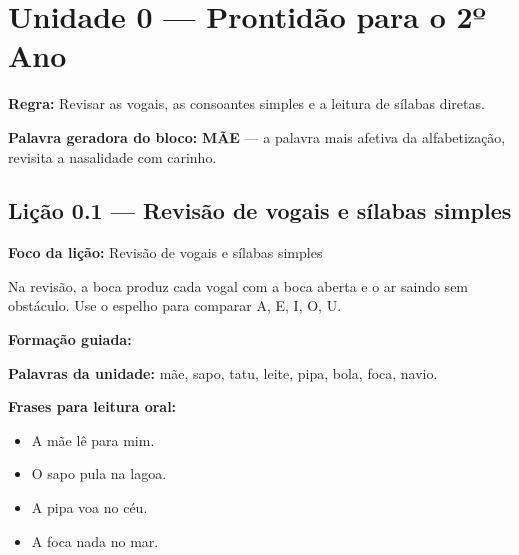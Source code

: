 

\chapter{Unidade 0 --- Prontidão para o 2º Ano}


\textbf{Regra:} Revisar as vogais, as consoantes simples e a leitura de sílabas diretas.

\textbf{Palavra geradora do bloco:} \textbf{MÃE} --- a palavra mais afetiva da alfabetização, revisita a nasalidade com carinho.

\section{Lição 0.1 --- Revisão de vogais e sílabas simples}

\textbf{Foco da lição:} Revisão de vogais e sílabas simples


\begin{boquinha}
Na revisão, a boca produz cada vogal com a boca aberta e o ar saindo sem obstáculo. Use o espelho para comparar A, E, I, O, U.
\end{boquinha}

\noindent\textbf{Formação guiada:}

\begin{center}
\end{center}

\noindent\textbf{Palavras da unidade:} mãe, sapo, tatu, leite, pipa, bola, foca, navio.

\noindent\textbf{Frases para leitura oral:}
\begin{itemize}[leftmargin=1.6em]
  \item A mãe lê para mim.
  \item O sapo pula na lagoa.
  \item A pipa voa no céu.
  \item A foca nada no mar.
\end{itemize}

